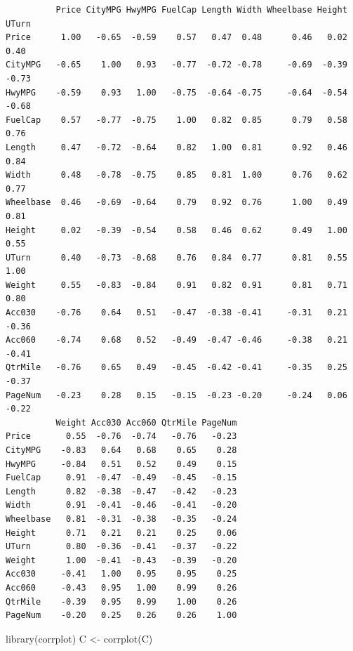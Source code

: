 \documentclass[
  letterpaper,
  DIV=11,
  numbers=noendperiod]{scrreprt}
\newenvironment{Shaded}{\begin{snugshade}}{\end{snugshade}}
\newcommand{\FunctionTok}[1]{\textcolor[rgb]{0.28,0.35,0.67}{#1}}
\newcommand{\NormalTok}[1]{\textcolor[rgb]{0.00,0.23,0.31}{#1}}
\newcommand{\OtherTok}[1]{\textcolor[rgb]{0.00,0.23,0.31}{#1}}
\begin{document}
\begin{verbatim}
          Price CityMPG HwyMPG FuelCap Length Width Wheelbase Height UTurn
Price      1.00   -0.65  -0.59    0.57   0.47  0.48      0.46   0.02  0.40
CityMPG   -0.65    1.00   0.93   -0.77  -0.72 -0.78     -0.69  -0.39 -0.73
HwyMPG    -0.59    0.93   1.00   -0.75  -0.64 -0.75     -0.64  -0.54 -0.68
FuelCap    0.57   -0.77  -0.75    1.00   0.82  0.85      0.79   0.58  0.76
Length     0.47   -0.72  -0.64    0.82   1.00  0.81      0.92   0.46  0.84
Width      0.48   -0.78  -0.75    0.85   0.81  1.00      0.76   0.62  0.77
Wheelbase  0.46   -0.69  -0.64    0.79   0.92  0.76      1.00   0.49  0.81
Height     0.02   -0.39  -0.54    0.58   0.46  0.62      0.49   1.00  0.55
UTurn      0.40   -0.73  -0.68    0.76   0.84  0.77      0.81   0.55  1.00
Weight     0.55   -0.83  -0.84    0.91   0.82  0.91      0.81   0.71  0.80
Acc030    -0.76    0.64   0.51   -0.47  -0.38 -0.41     -0.31   0.21 -0.36
Acc060    -0.74    0.68   0.52   -0.49  -0.47 -0.46     -0.38   0.21 -0.41
QtrMile   -0.76    0.65   0.49   -0.45  -0.42 -0.41     -0.35   0.25 -0.37
PageNum   -0.23    0.28   0.15   -0.15  -0.23 -0.20     -0.24   0.06 -0.22
          Weight Acc030 Acc060 QtrMile PageNum
Price       0.55  -0.76  -0.74   -0.76   -0.23
CityMPG    -0.83   0.64   0.68    0.65    0.28
HwyMPG     -0.84   0.51   0.52    0.49    0.15
FuelCap     0.91  -0.47  -0.49   -0.45   -0.15
Length      0.82  -0.38  -0.47   -0.42   -0.23
Width       0.91  -0.41  -0.46   -0.41   -0.20
Wheelbase   0.81  -0.31  -0.38   -0.35   -0.24
Height      0.71   0.21   0.21    0.25    0.06
UTurn       0.80  -0.36  -0.41   -0.37   -0.22
Weight      1.00  -0.41  -0.43   -0.39   -0.20
Acc030     -0.41   1.00   0.95    0.95    0.25
Acc060     -0.43   0.95   1.00    0.99    0.26
QtrMile    -0.39   0.95   0.99    1.00    0.26
PageNum    -0.20   0.25   0.26    0.26    1.00
\end{verbatim}

\begin{Shaded}
\begin{Highlighting}[]
\FunctionTok{library}\NormalTok{(corrplot)}
\NormalTok{C }\OtherTok{\textless{}{-}} \FunctionTok{corrplot}\NormalTok{(C)}
\end{Highlighting}
\end{Shaded}
\end{document}
